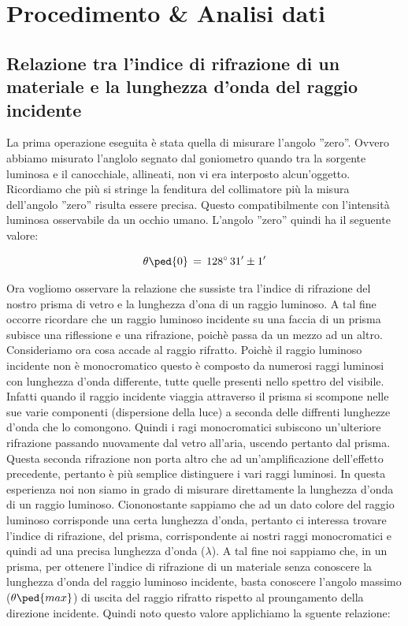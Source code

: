 \section{Procedimento \& Analisi dati}

\subsection{Relazione tra l'indice di rifrazione di un materiale e la lunghezza d'onda del raggio incidente}

La prima operazione eseguita è stata quella di misurare l'angolo ''zero''. Ovvero abbiamo misurato l'anglolo segnato dal goniometro quando tra la sorgente luminosa e il canocchiale, allineati, non vi era interposto alcun'oggetto. Ricordiamo che più si stringe la fenditura del collimatore più la misura dell'angolo ''zero'' risulta essere precisa. Questo compatibilmente con l'intensità luminosa osservabile da un occhio umano.
L'angolo ''zero'' quindi ha il seguente valore:

\begin{equation}
	\theta\ped{0} \,=\, 128^\circ \,31' \pm 1'
\end{equation} 

Ora vogliomo osservare la relazione che sussiste tra l'indice di rifrazione del nostro prisma di vetro e la lunghezza d'ona di un raggio luminoso.
A tal fine occorre ricordare che un raggio luminoso incidente su una faccia di un prisma subisce una riflessione e una rifrazione, poichè passa da un mezzo ad un altro.
Consideriamo ora cosa accade al raggio rifratto. Poichè il raggio luminoso incidente non è monocromatico questo è composto da numerosi raggi luminosi con lunghezza d'onda differente, tutte quelle presenti nello spettro del visibile. Infatti quando il raggio incidente viaggia attraverso il prisma si scompone nelle sue varie componenti (dispersione della luce) a seconda delle diffrenti lunghezze d'onda che lo comongono. Quindi i ragi monocromatici subiscono un'ulteriore rifrazione passando nuovamente dal vetro all'aria, uscendo pertanto dal prisma. Questa seconda rifrazione non porta altro che ad un'amplificazione dell'effetto precedente, pertanto è più semplice distinguere i vari raggi luminosi.
In questa esperienza noi non siamo in grado di misurare direttamente la lunghezza d'onda di un raggio luminoso. Ciononostante sappiamo che ad un dato colore del raggio luminoso corrisponde una certa lunghezza d'onda, pertanto ci interessa trovare l'indice di rifrazione, del prisma, corrispondente ai nostri raggi monocromatici e quindi ad una precisa lunghezza d'onda ($\lambda$).
A tal fine noi sappiamo che, in un prisma, per ottenere l'indice di rifrazione di un materiale senza conoscere la lunghezza d'onda del raggio luminoso incidente, basta conoscere l'angolo massimo ($\theta\ped{max}$) di uscita del raggio rifratto rispetto al proungamento della direzione incidente. Quindi noto questo valore applichiamo la sguente relazione:


